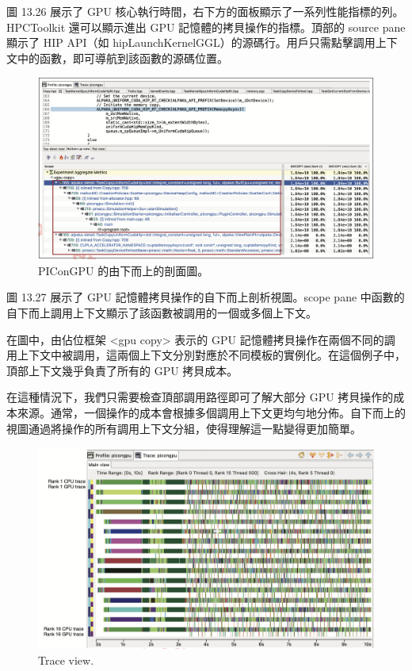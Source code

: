 圖 13.26 展示了 GPU 核心執行時間，右下方的面板顯示了一系列性能指標的列。HPCToolkit 還可以顯示進出 GPU 記憶體的拷貝操作的指標。頂部的 source pane 顯示了 HIP API（如 hipLaunchKernelGGL）的源碼行。用戶只需點擊調用上下文中的函數，即可導航到該函數的源碼位置。


\begin{figure}
    \centering
    \includegraphics[width=0.9\linewidth]{FileAusiliari/Screenshots/Figure13-27.png}
    \caption{PIConGPU 的由下而上的剖面圖。}
    \label{fig:PAPI27}
\end{figure}
圖 13.27 展示了 GPU 記憶體拷貝操作的自下而上剖析視圖。scope pane 中函數的自下而上調用上下文顯示了該函數被調用的一個或多個上下文。

在圖中，由佔位框架 <gpu copy> 表示的 GPU 記憶體拷貝操作在兩個不同的調用上下文中被調用，這兩個上下文分別對應於不同模板的實例化。在這個例子中，頂部上下文幾乎負責了所有的 GPU 拷貝成本。

在這種情況下，我們只需要檢查頂部調用路徑即可了解大部分 GPU 拷貝操作的成本來源。通常，一個操作的成本會根據多個調用上下文更均勻地分佈。自下而上的視圖通過將操作的所有調用上下文分組，使得理解這一點變得更加簡單。

\begin{figure}
    \centering
    \includegraphics[width=0.9\linewidth]{FileAusiliari/Screenshots/Figure13-28.png}
    \caption{Trace view.}
    \label{fig:PAPI28}
\end{figure}

